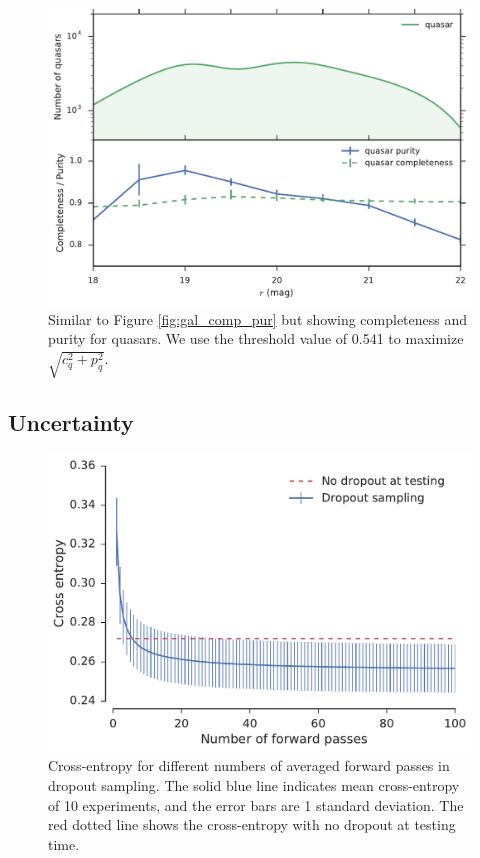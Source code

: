 \documentclass[fleqn,usenatbib]{mnras}
\begin{document}
\begin{figure}
  \centering
  \includegraphics[width=\columnwidth]{figures/qso_comp_pur.pdf}
  \caption{
    Similar to Figure \ref{fig:gal_comp_pur} but showing completeness and purity for quasars.
    We use the threshold value of 0.541 to maximize $\sqrt{ c_q^2 + p_q^2 }$.
    }
  \label{fig:qso_comp_pur}
\end{figure}


\subsection{Uncertainty}

\begin{figure}
  \centering
  \includegraphics[width=\columnwidth]{figures/mcmc_loss.pdf}
  \caption{
    Cross-entropy for different numbers of averaged forward passes in dropout sampling.
    The solid blue line indicates mean cross-entropy of 10 experiments, and the error bars are 1 standard deviation.
    The red dotted line shows the cross-entropy with no dropout at testing time.
    }
  \label{fig:mcmc_loss}
\end{figure}
\end{document}
